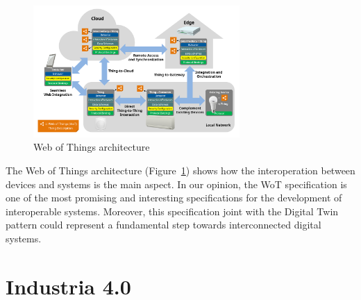 \begin{figure}[h]
	\centering
	\includegraphics[width=0.7\textwidth]{img/wot.png}
	\caption{Web of Things architecture}
	\label{fig:iot}
\end{figure}

The Web of Things architecture (Figure~\ref{fig:iot}) shows how the interoperation between devices and systems is the main aspect.
In our opinion, the WoT specification is one of the most promising and interesting specifications for the development of interoperable systems.
Moreover, this specification joint with the Digital Twin pattern could represent a fundamental step towards interconnected digital systems.

\section{Industria 4.0}
